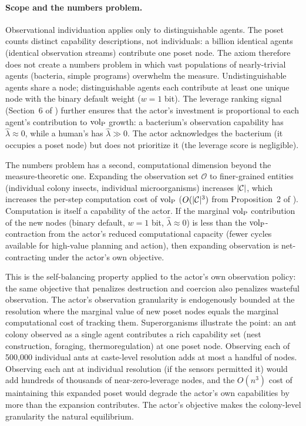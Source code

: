 \paragraph{Scope and the numbers problem.} Observational individuation
applies only to distinguishable agents. The poset counts distinct
capability descriptions, not individuals: a billion identical agents
(identical observation streams) contribute one poset node. The axiom
therefore does not create a numbers problem in which vast populations of
nearly-trivial agents (bacteria, simple programs) overwhelm the measure.
Undistinguishable agents share a node; distinguishable agents each
contribute at least one unique node with the binary default weight ($w = 1$
bit). The leverage ranking signal (Section~6 of \citet{lasser2026poset})
further ensures that the actor's investment is proportional to each agent's
contribution to ${\operatorname{vol}_{\mathrm{P}}}$ growth: a bacterium's observation capability has
$\hat{\lambda} \approx 0$, while a human's has $\hat{\lambda} \gg 0$. The
actor acknowledges the bacterium (it occupies a poset node) but does not
prioritize it (the leverage score is negligible).

\begin{remark}
\label{rem:obs_cost}
The numbers problem has a second, computational dimension beyond the
    measure-theoretic one. Expanding the observation set $\mathcal{O}$ to
    finer-grained entities (individual colony insects, individual
    microorganisms) increases $|\mathcal{C}|$, which increases the per-step
    computation cost of ${\operatorname{vol}_{\mathrm{P}}}$ ($O(|\mathcal{C}|^3)$ from Proposition~2 of
    \citet{lasser2026poset}). Computation is itself a capability of the
    actor. If the marginal ${\operatorname{vol}_{\mathrm{P}}}$ contribution of the new nodes (binary
    default, $w = 1$ bit, $\hat{\lambda} \approx 0$) is less than the
    ${\operatorname{vol}_{\mathrm{P}}}$-contraction from the actor's reduced computational capacity
    (fewer cycles available for high-value planning and action), then
    expanding observation is net-contracting under the actor's own objective.

This is the self-balancing property applied to the actor's own observation
    policy: the same objective that penalizes destruction and coercion also
    penalizes wasteful observation. The actor's observation granularity is
    endogenously bounded at the resolution where the marginal value of new
    poset nodes equals the marginal computational cost of tracking them.
    Superorganisms illustrate the point: an ant colony observed as a single
    agent contributes a rich capability set (nest construction, foraging,
    thermoregulation) at one poset node. Observing each of 500,000
    individual ants at caste-level resolution adds at most a handful of
    nodes. Observing each ant at individual resolution (if the sensors
    permitted it) would add hundreds of thousands of near-zero-leverage
    nodes, and the $O(n^3)$ cost of maintaining this expanded poset would
    degrade the actor's own capabilities by more than the expansion
    contributes. The actor's objective makes the colony-level granularity
    the natural equilibrium.
\end{remark}

